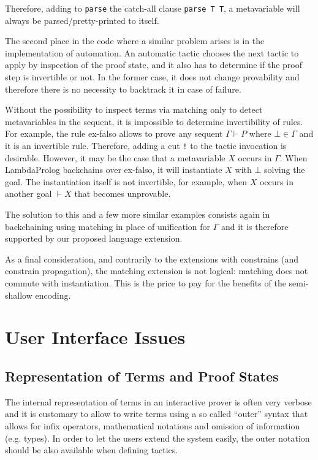 \documentclass[preprint]{sigplanconf}
\begin{document}
Therefore, adding to \verb+parse+ the catch-all clause \verb+parse T T+, a metavariable will always be parsed/pretty-printed to itself.

The second place in the code where a similar problem arises is in the implementation of automation. An automatic tactic chooses the next tactic to apply by inspection of the proof state, and it also has to determine if the proof step is invertible or not. In the former case, it does not change provability and therefore there is no necessity to backtrack it in case of failure.

Without the possibility to inspect terms via matching only to detect metavariables in the sequent, it is impossible to determine invertibility of rules. For example, the rule ex-falso allows to prove any sequent $\Gamma \vdash P$ where
$\bot \in \Gamma$ and it is an invertible rule. Therefore, adding a cut {\texttt !} to the tactic invocation is desirable. However, it may be the case that
a metavariable $X$ occurs in $\Gamma$. When LambdaProlog backchains over ex-falso, it will instantiate $X$ with $\bot$ solving the goal. The instantiation itself is not invertible, for example, when $X$ occurs in another goal $\vdash X$ that becomes unprovable.

The solution to this and a few more similar examples consists again in backchaining using matching in place of unification for $\Gamma$ and it is therefore supported by our proposed language extension.

As a final consideration, and contrarily to the extensions with constrains (and constrain propagation), the matching extension is not logical: matching does not commute with instantiation. This is the price to pay for the benefits of the semi-shallow encoding.

\section{User Interface Issues}
\subsection{Representation of Terms and Proof States}
The internal representation of terms in an interactive prover is often very verbose and it is customary to allow to write terms using a so called ``outer'' syntax that allows for infix operators, mathematical notations and omission of information (e.g. types). In order to let the users extend the system easily, the outer notation should be also available when defining tactics.
\end{document}
